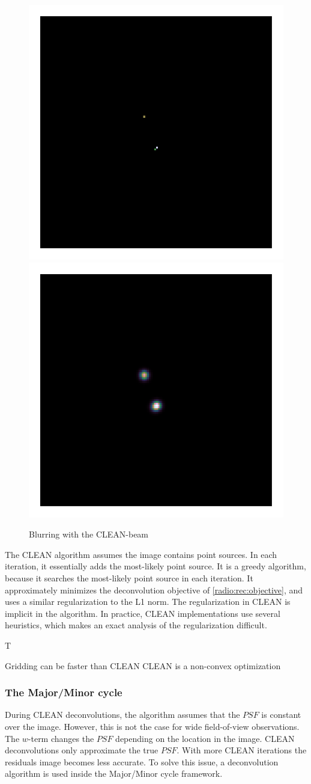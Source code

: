 \begin{figure}[h]
	\centering
	\includegraphics[width=0.25\linewidth, clip, trim= 1.0in 1.0in 1.0in 1.0in]{./chapters/01.intro/cleanExample/model_CLEAN_3.png}
	\includegraphics[width=0.25\linewidth, clip, trim= 1.0in 1.0in 1.0in 1.0in]{./chapters/01.intro/cleanExample/rec_CLEAN.png}
	\caption{Blurring with the CLEAN-beam}
	\label{radio:clean:beam}
\end{figure}

The CLEAN algorithm assumes the image contains point sources. In each iteration, it essentially adds the most-likely point source. It is a greedy algorithm, because it searches the most-likely point source in each iteration. It approximately minimizes the deconvolution objective of \eqref{radio:rec:objective}, and uses a similar regularization to the L1 norm. The regularization in CLEAN is implicit in the algorithm. In practice, CLEAN implementations use several heuristics, which makes an exact analysis of the regularization difficult.

T

Gridding can be faster than CLEAN
CLEAN is a non-convex optimization

\subsubsection{The Major/Minor cycle}\label{intro2:opt:cycle}
During CLEAN deconvolutions, the algorithm assumes that the $PSF$ is constant over the image. However, this is not the case for wide field-of-view observations. The $w$-term changes the $PSF$ depending on the location in the image. CLEAN deconvolutions only approximate the true $PSF$. With more CLEAN iterations the residuals image becomes less accurate. To solve this issue, a deconvolution algorithm is used inside the Major/Minor cycle framework. 

